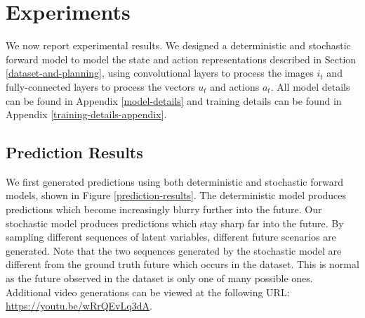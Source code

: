 \documentclass{article} %
\begin{document}
\section{Experiments}
\label{experiments}

We now report experimental results. We designed a deterministic and stochastic forward model to model the state and action representations described in Section \ref{dataset-and-planning}, using convolutional layers to process the images $i_t$ and fully-connected layers to process the vectors $u_t$ and actions $a_t$. All model details can be found in Appendix \ref{model-details} and training details can be found in Appendix \ref{training-details-appendix}.


    \subsection{Prediction Results}


    We first generated predictions using both deterministic and stochastic forward models, shown in  Figure \ref{prediction-results}.
    The deterministic model produces predictions which become increasingly blurry further into the future. Our stochastic model produces predictions which stay sharp far into the future.
    By sampling different sequences of latent variables, different future scenarios are generated.
    Note that the two sequences generated by the stochastic model are different from the ground truth future which occurs in the dataset.
    This is normal as the future observed in the dataset is only one of many possible ones.
    Additional video generations can be viewed at the following URL: \url{https://youtu.be/wRrQEvLq3dA}.
\end{document}
